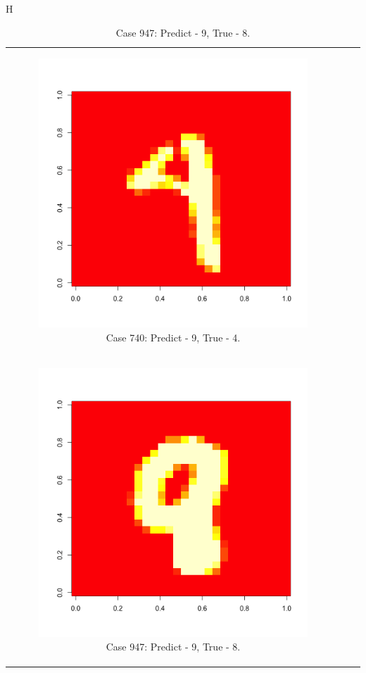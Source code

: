 \documentclass[10pt]{extarticle}
\begin{document}
\begin{table}{H}
\begin{tabular}{c c c}
\begin{subfigure}{0.3\textwidth}\centering\includegraphics[scale = .25]{../Images/740.png}\caption{Case 740: Predict - 9, True - 4.}\label{fig:taba}\end{subfigure}\\
\newline
\begin{subfigure}{0.3\textwidth}\centering\includegraphics[scale = .25]{../Images/947.png}\caption{Case 947: Predict - 9, True - 8.}\label{fig:taba}\end{subfigure}&

\end{tabular}
\end{table}
\end{document}
